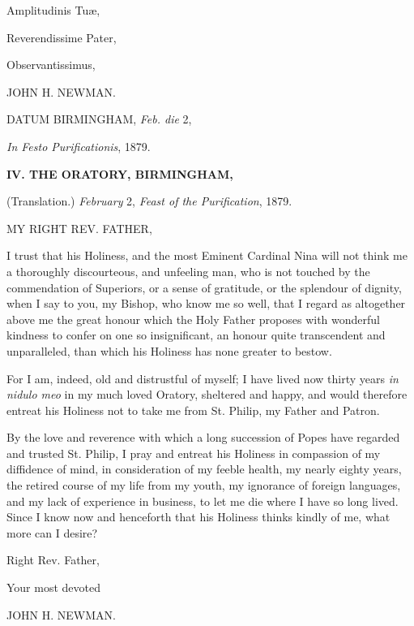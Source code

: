 Amplitudinis Tuæ,

Reverendissime Pater,

Observantissimus,

JOHN H. NEWMAN.

DATUM BIRMINGHAM,
\emph{Feb. die} 2,

\emph{In Festo Purificationis}, 1879.

\textbf{IV. THE ORATORY, BIRMINGHAM,}

(Translation.)
\emph{February} 2, \emph{Feast of the Purification}, 1879.

MY RIGHT REV.
FATHER,

I trust that his Holiness, and the most Eminent Cardinal Nina will not
think me a thoroughly discourteous, and unfeeling man, who is not
touched by the commendation of Superiors, or a sense of gratitude, or
the splendour of dignity, when I say to you, my Bishop, who know me so
well, that I regard as altogether above me the great honour which the
Holy Father proposes with wonderful kindness to confer on one so
insignificant, an honour quite transcendent and unparalleled, than
which his Holiness has none greater to bestow.

For I am, indeed, old and distrustful of myself; I have lived now
thirty years \emph{in nidulo meo} in my much loved Oratory, sheltered
and happy, and would therefore entreat his Holiness not to take me
from St. Philip, my Father and Patron.

By the love and reverence with which a long succession of Popes
have regarded and trusted St. Philip, I pray and entreat his Holiness in compassion of my diffidence of mind, in consideration of
my feeble health, my nearly eighty years, the retired course of my
life from my youth, my ignorance of foreign languages, and my lack of
experience in business, to let me die where I have so long lived.
Since I know now and henceforth that his Holiness thinks kindly of me,
what more can I desire?

Right Rev. Father,

Your most devoted

JOHN H. NEWMAN.


